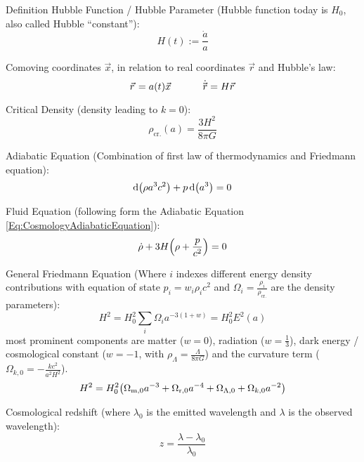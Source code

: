 		\noindent
		Definition Hubble Function / Hubble Parameter{} (Hubble function today is $H_0$, also called Hubble ``constant''):
		\begin{equation}
			H(t) := \frac{\dot{a}}{a}
		\end{equation}

		\noindent
		Comoving coordinates $\vec{x}$, in relation to real coordinates $\vec{r}$ and Hubble's law:
		\begin{equation}
			\vec{r} = a(t) \vec{x}
			\hsp
			\dot{\vec{r}} = H \vec{r}
		\end{equation}

		\noindent
		Critical Density (\ie density leading to $k=0$):
		\begin{equation}
			\rho_\text{cr.} (a) = \frac{3 H^2}{8 \pi G}
		\end{equation}

		\noindent
		Adiabatic Equation (Combination of first law of thermodynamics and Friedmann equation):
		\begin{equation}
			\label{Eq:CosmologyAdiabaticEquation}
			\dd \qty(\rho a^3 c^2) + p \dd (a^3) = 0
		\end{equation}

		\noindent
		Fluid Equation (following form the Adiabatic Equation \ref{Eq:CosmologyAdiabaticEquation}):
		\begin{equation}
			\dot{\rho} + 3 H \qty(\rho + \frac{p}{c^2}) = 0
		\end{equation}

		\noindent
		General Friedmann Equation (Where $i$ indexes different energy density contributions with equation of state $p_i = w_i \rho_i c^2$ and $\Omega_i = \frac{\rho_i}{\rho_\text{cr.}}$ are the density parameters):
		\begin{equation}
			H^2 = H_0^2\sum_i \Omega_i a^{-3(1+w)} = H_0^2 E^2(a)
		\end{equation}
		most prominent components are matter ($w=0$), radiation ($w=\frac{1}{3}$), dark energy / cosmological constant ($w=-1$, with $\rho_\Lambda = \frac{\Lambda}{8\pi G}$) and the curvature term ($\Omega_{k,0}=-\frac{k c^2}{a^2 H^2}$).
		\begin{equation}
			H^2 = H_0^2 \qty(\Omega_{\text{m},0} a^{-3} + \Omega_{\text{r},0} a^{-4} + \Omega_{\Lambda,0} + \Omega_{k,0} a^{-2})
		\end{equation}

		\noindent
		Cosmological redshift (where $\lambda_0$ is the emitted wavelength and $\lambda$ is the observed wavelength):
		\begin{equation}
			z = \frac{\lambda - \lambda_0}{\lambda_0}
		\end{equation}


